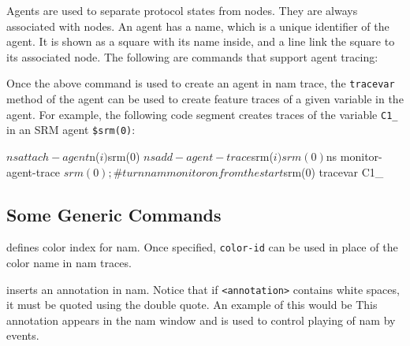 Agents are used to separate protocol states from nodes. They are always
associated with nodes. An agent has a name, which is a unique identifier
of the agent. It is shown as a square with its name inside, and a line
link the square to its associated node. The following are commands that
support agent tracing:

Once the above command is used to create an agent in nam trace, the
{\tt tracevar} method of the \ns agent can be used to create feature
traces of a given variable in the agent. 
For example, the following code segment creates traces of the variable
{\tt C1\_} in an SRM agent {\tt \$srm(0)}:

\begin{program}
        $ns attach-agent $n($i) $srm(0)
        $ns add-agent-trace $srm($i) srm(0)
        $ns monitor-agent-trace $srm(0) ;\# turn nam monitor on from the start
        $srm(0) tracevar C1_
\end{program} %

\subsection{Some Generic Commands}

defines color index for nam. Once
specified, {\tt color-id} can be used in place of the color name in
nam traces.

inserts an annotation in nam. Notice that if {\tt <annotation>} 
contains white spaces, it must be quoted using the double quote.
An example of this would be
This annotation appears in the nam window and is used to control
playing of nam by events. 


